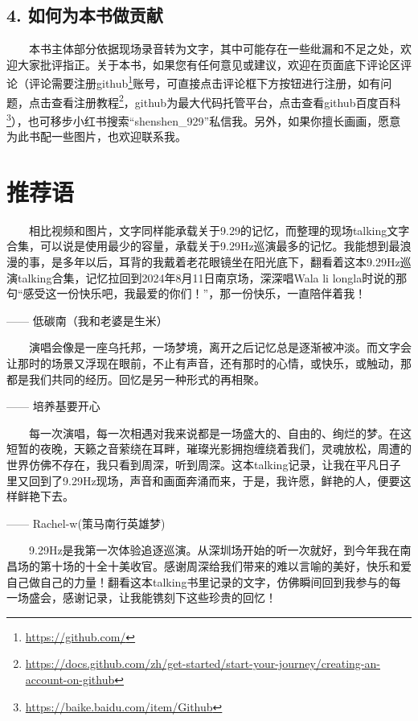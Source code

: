 \documentclass[]{ctexbook}
\renewcommand{\href}[2]{#2\footnote{\url{#1}}}
\begin{document}
\subsection*{4. 如何为本书做贡献}\label{how-to-contribute}


  本书主体部分依据现场录音转为文字，其中可能存在一些纰漏和不足之处，欢迎大家批评指正。关于本书，如果您有任何意见或建议，欢迎在页面底下评论区评论（评论需要注册\href{https://github.com/}{github}账号，可直接点击评论框下方按钮进行注册，\href{https://docs.github.com/zh/get-started/start-your-journey/creating-an-account-on-github}{如有问题，点击查看注册教程}，github为最大代码托管平台，\href{https://baike.baidu.com/item/Github}{点击查看github百度百科}），也可移步小红书搜索``shenshen\_929''私信我。另外，如果你擅长画画，愿意为此书配一些图片，也欢迎联系我。

\newpage

\section*{推荐语}\label{recommendation}


  相比视频和图片，文字同样能承载关于9.29的记忆，而整理的现场talking文字合集，可以说是使用最少的容量，承载关于9.29Hz巡演最多的记忆。我能想到最浪漫的事，是多年以后，耳背的我戴着老花眼镜坐在阳光底下，翻看着这本9.29Hz巡演talking合集，记忆拉回到2024年8月11日南京场，深深唱Wala li longla时说的那句``感受这一份快乐吧，我最爱的你们！''，那一份快乐，一直陪伴着我！

------ 低碳南（我和老婆是生米）

  演唱会像是一座乌托邦，一场梦境，离开之后记忆总是逐渐被冲淡。而文字会让那时的场景又浮现在眼前，不止有声音，还有那时的心情，或快乐，或触动，那都是我们共同的经历。回忆是另一种形式的再相聚。

------ 培养基要开心

  每一次演唱，每一次相遇对我来说都是一场盛大的、自由的、绚烂的梦。在这短暂的夜晚，天籁之音萦绕在耳畔，璀璨光影拥抱缠绕着我们，灵魂放松，周遭的世界仿佛不存在，我只看到周深，听到周深。这本talking记录，让我在平凡日子里又回到了9.29Hz现场，声音和画面奔涌而来，于是，我许愿，鲜艳的人，便要这样鲜艳下去。

------ Rachel-w(策马南行英雄梦)

  9.29Hz是我第一次体验追逐巡演。从深圳场开始的听一次就好，到今年我在南昌场的第十场的十全十美收官。感谢周深给我们带来的难以言喻的美好，快乐和爱自己做自己的力量！翻看这本talking书里记录的文字，仿佛瞬间回到我参与的每一场盛会，感谢记录，让我能镌刻下这些珍贵的回忆！
\end{document}
